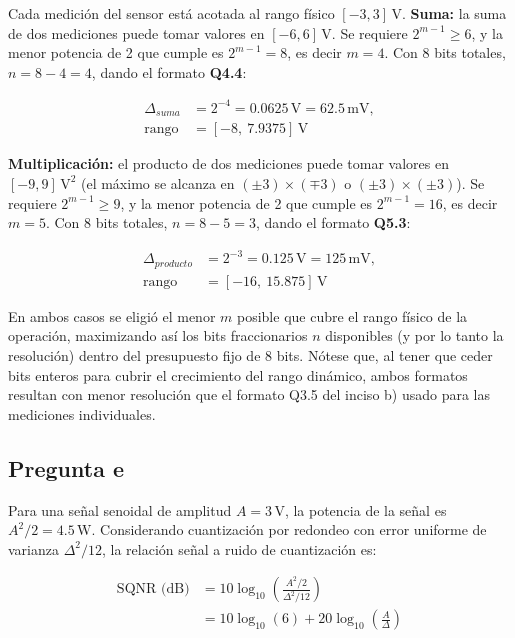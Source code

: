 \documentclass[conference]{IEEEtran}
\begin{document}
Cada medición del sensor está acotada al rango físico $[-3,3]\,\text{V}$.
\textbf{Suma:} la suma de dos mediciones puede tomar valores en $[-6,6]\,\text{V}$. Se requiere $2^{m-1}\geq6$, y la menor potencia de 2 que cumple es $2^{m-1}=8$, es decir $m=4$. Con 8 bits totales, $n=8-4=4$, dando el formato \textbf{Q4.4}:

\begin{equation}
\begin{aligned}
\Delta_{suma} &= 2^{-4} = 0.0625\,\text{V} = 62.5\,\text{mV},\\
\text{rango} &= [-8,\ 7.9375]\,\text{V}
\end{aligned}
\label{eq:quantum_suma}
\end{equation}

\textbf{Multiplicación:} el producto de dos mediciones puede tomar valores en $[-9,9]\,\text{V}^2$ (el máximo se alcanza en $(\pm3)\times(\mp3)$ o $(\pm3)\times(\pm3)$). Se requiere $2^{m-1}\geq9$, y la menor potencia de 2 que cumple es $2^{m-1}=16$, es decir $m=5$. Con 8 bits totales, $n=8-5=3$, dando el formato \textbf{Q5.3}:

\begin{equation}
\begin{aligned}
\Delta_{producto} &= 2^{-3} = 0.125\,\text{V} = 125\,\text{mV},\\
\text{rango} &= [-16,\ 15.875]\,\text{V}
\end{aligned}
\label{eq:quantum_producto}
\end{equation}

En ambos casos se eligió el menor $m$ posible que cubre el rango físico de la operación, maximizando así los bits fraccionarios $n$ disponibles (y por lo tanto la resolución) dentro del presupuesto fijo de 8 bits. Nótese que, al tener que ceder bits enteros para cubrir el crecimiento del rango dinámico, ambos formatos resultan con menor resolución que el formato Q3.5 del inciso b) usado para las mediciones individuales.

\subsection{Pregunta e}

Para una señal senoidal de amplitud $A=3\,\text{V}$, la potencia de la señal es $A^2/2=4.5\,\text{W}$. Considerando cuantización por redondeo con error uniforme de varianza $\Delta^2/12$, la relación señal a ruido de cuantización es:

\begin{equation}
\begin{aligned}
\text{SQNR (dB)}
&= 10\log_{10}\!\left(
\frac{A^2/2}{\Delta^2/12}
\right) \\
&= 10\log_{10}(6)
+ 20\log_{10}\!\left(\frac{A}{\Delta}\right)
\end{aligned}
\label{eq:sqnr}
\end{equation}
\end{document}
